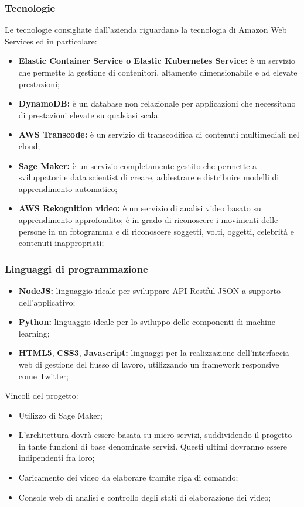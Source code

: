     \subsubsection{Tecnologie}
    Le tecnologie consigliate dall'azienda riguardano la tecnologia di Amazon Web Services ed in particolare:
    \begin{itemize}
        \item \textbf{Elastic Container Service o Elastic Kubernetes Service: }è un servizio che permette la gestione di contenitori, altamente dimensionabile e ad elevate prestazioni;
        \item \textbf{DynamoDB: }è un database non relazionale per applicazioni che necessitano di prestazioni elevate su qualsiasi scala.
        \item \textbf{AWS Transcode: }è un servizio di transcodifica di contenuti multimediali nel cloud;
        \item \textbf{Sage Maker: } è un servizio completamente gestito che permette a sviluppatori e data scientist di creare, addestrare e distribuire modelli di apprendimento automatico;
        \item \textbf{AWS Rekognition video: } è un servizio di analisi video basato su apprendimento approfondito; è in grado di riconoscere i movimenti delle persone in un fotogramma e di riconoscere soggetti, volti, oggetti, celebrità e contenuti inappropriati;
    \end{itemize}
        \subsubsection{Linguaggi di programmazione}
        \begin{itemize}
            \item \textbf{NodeJS: }linguaggio ideale per sviluppare API Restful JSON a supporto dell'applicativo;
            \item \textbf{Python: }linguaggio ideale per lo sviluppo delle componenti di machine learning;
            \item \textbf{HTML5}, \textbf{CSS3}, \textbf{Javascript: }linguaggi per la realizzazione dell'interfaccia web di gestione del flusso di lavoro, utilizzando un framework responsive come Twitter;
        \end{itemize}
    Vincoli del progetto:
    \begin{itemize}
        \item Utilizzo di Sage Maker;
        \item L'architettura dovrà essere basata su micro-servizi, suddividendo il progetto in tante funzioni di base denominate servizi. Questi ultimi dovranno essere indipendenti fra loro;
        \item Caricamento dei video da elaborare tramite riga di comando;
        \item Console web di analisi e controllo degli stati di elaborazione dei video; 
        
        
    \end{itemize}
    

